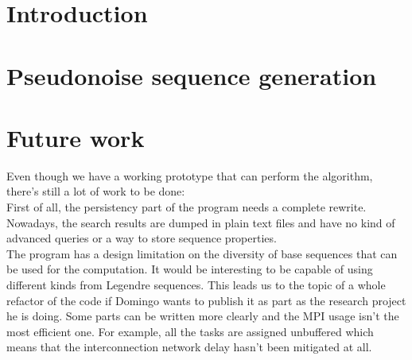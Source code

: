 \documentclass{tfg_domingo}
\begin{document}

\portada
\frontmatter
\gracias{}
\resumen{}{}
\tableofcontents

\mainmatter


\chapter{Introduction}



\chapter{Pseudonoise sequence generation}











\chapter{Future work}

  Even though we have a working prototype that can perform the algorithm,
  there's still a lot of work to be done:\\

  First of all, the persistency part of the program needs a complete rewrite.
  Nowadays, the search results are dumped in plain text files and have no
  kind of advanced queries or a way to store sequence properties.\\

  The program has a design limitation on the diversity of base sequences
  that can be used for the computation. It would be interesting to be capable
  of using different kinds from Legendre sequences. This leads us to the topic
  of a whole refactor of the code if Domingo wants to publish it as part as
  the research project he is doing. Some parts can be written more clearly
  and the MPI usage isn't the most efficient one. For example, all the tasks
  are assigned unbuffered which means that the interconnection network delay
  hasn't been mitigated at all.\\
\end{document}
